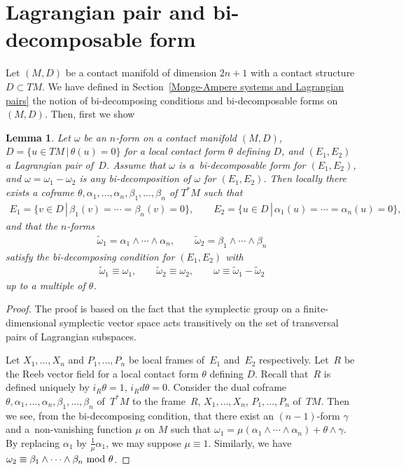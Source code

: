 \documentclass[pdftex]{sigma}
\newtheorem{Lem}[Th]{Lemma}
{ \theoremstyle{definition}
\newtheorem{Def}[Th]{Definition}
\newtheorem{Rem}[Th]{Remark}
\newtheorem{Ex}[Th]{Example}}
\begin{document}
\section{Lagrangian pair and bi-decomposable form}
\label{Lagrangian pair and bi-decomposable forms.}

Let $(M, D)$ be a contact manifold of dimension $2n+1$ with
a contact structure $D \subset TM$.
We have def\/ined in Section~\ref{Monge-Ampere systems and Lagrangian pairs} the notion of bi-decomposing
conditions and bi-decomposable forms on~$(M, D)$.
Then, f\/irst we show

\begin{Lem}
\label{bi-decomposability}
Let $\omega$ be an $n$-form on a contact manifold $(M, D)$,
$D = \{ u \in TM \,|\, \theta(u) = 0\}$
for a local contact form $\theta$ defining $D$,
and $(E_1, E_2)$
a Lagrangian pair of~$D$.
Assume that $\omega$ is
a~bi-decomposable form for $(E_1, E_2)$,
and $\omega = \omega_1 - \omega_2$ is
any bi-decomposition of $\omega$ for $(E_1, E_2)$.
Then locally there exists a coframe
$\theta, \alpha_1, \dots, \alpha_n, \beta_1, \dots, \beta_n$
of $T^*M$ such that
\begin{gather*}
E_1 = \{ v \in D \,|\, \beta_1(v) = \cdots = \beta_n(v) = 0\}, \qquad
E_2 = \{ u \in D \,|\, \alpha_1(u) = \cdots = \alpha_n(u) = 0\},
\end{gather*}
and that the $n$-forms
\begin{gather*}
\widetilde{\omega}_1 = \alpha_1\wedge \cdots \wedge \alpha_n,
\qquad
\widetilde{\omega}_2 = \beta_1\wedge \cdots \wedge \beta_n
\end{gather*}
satisfy the bi-decomposing condition for
$(E_1, E_2)$ with
\begin{gather*}
\widetilde{\omega}_1 \equiv \omega_1, \qquad
\widetilde{\omega}_2 \equiv \omega_2, \qquad
\omega \equiv \widetilde{\omega}_1 - \widetilde{\omega}_2
\end{gather*}
up to a multiple of $\theta$.
\end{Lem}

\begin{proof}
The proof is based on the fact that the symplectic group on a f\/inite-dimensional symplectic vector space
acts transitively on the set of transversal pairs of Lagrangian subspaces.

Let $X_1, \dots, X_n$ and $P_1, \dots, P_n$ be local frames
of~$E_1$ and~$E_2$ respectively.
Let~$R$ be the Reeb vector f\/ield
for a local contact form $\theta$ def\/ining $D$. Recall that~$R$ is def\/ined uniquely by $i_R \theta = 1$, $i_R d\theta = 0$.
Consider
the dual coframe $\theta, \alpha_1,\dots,\alpha_n, \beta_1,\dots,\beta_n$
of~$T^*M$
to the frame~$R$, $X_1, \dots, X_n$, $P_1, \dots, P_n$ of~$TM$.
Then we see, from the bi-decomposing condition,
that there exist an $(n-1)$-form $\gamma$ and a~non-vanishing function $\mu$ on $M$ such that
$\omega_1 = \mu(\alpha_1 \wedge \cdots \wedge \alpha_n) + \theta\wedge\gamma$.
By replacing $\alpha_1$ by $\frac1{\mu}\alpha_1$,
we may suppose $\mu \equiv 1$.
Similarly, we have $\omega_2 \equiv
\beta_1 \wedge \cdots \wedge \beta_n \ \rm{mod}\ \theta$.
\end{proof}
\end{document}
